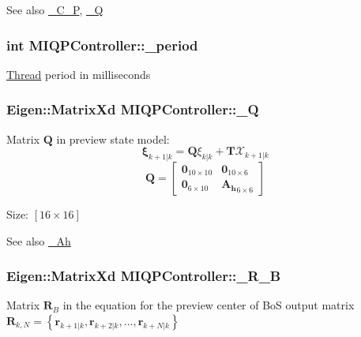 \begin{DoxySeeAlso}{\-See also}
\hyperlink{classMIQPController_a17cf6f8279cf6b2ce333feb9c8fc5a5d}{\-\_\-\-C\-\_\-\-P}, \hyperlink{classMIQPController_ac6404f74d6002d6a0ca4bd2d0b41d548}{\-\_\-\-Q} 
\end{DoxySeeAlso}
\hypertarget{classMIQPController_aed2ce53008e32e64e107398d85e75170}{
\subsubsection[{\-\_\-period}]{\setlength{\rightskip}{0pt plus 5cm}int {\bf \-M\-I\-Q\-P\-Controller\-::\-\_\-period}}}\label{classMIQPController_aed2ce53008e32e64e107398d85e75170}
\hyperlink{classThread}{\-Thread} period in milliseconds \hypertarget{classMIQPController_ac6404f74d6002d6a0ca4bd2d0b41d548}{
\subsubsection[{\-\_\-\-Q}]{\setlength{\rightskip}{0pt plus 5cm}\-Eigen\-::\-Matrix\-Xd {\bf \-M\-I\-Q\-P\-Controller\-::\-\_\-\-Q}}}\label{classMIQPController_ac6404f74d6002d6a0ca4bd2d0b41d548}
\-Matrix $\mathbf{Q}$ in preview state model\-: \[ \mathbf{\xi}_{k+1|k} = \mathbf{Q} \xi_{k|k} + \mathbf{T}\mathcal{X}_{k+1|k} \] \[ \mathbf{Q} = \left[\begin{array}{cc} \mathbf{0}_{10\times10} & \mathbf{0}_{10\times6}\\ \mathbf{0}_{6\times10} & \mathbf{A_h}_{6\times6} \end{array}\right] \]

\-Size\-: $[16\times16]$

\begin{DoxySeeAlso}{\-See also}
\hyperlink{classMIQPController_a388ed1c232c212e171276993b5cb3fec}{\-\_\-\-Ah} 
\end{DoxySeeAlso}
\hypertarget{classMIQPController_a69fbc25a2e2f2392fe0f92c5811c12dd}{
\subsubsection[{\-\_\-\-R\-\_\-\-B}]{\setlength{\rightskip}{0pt plus 5cm}\-Eigen\-::\-Matrix\-Xd {\bf \-M\-I\-Q\-P\-Controller\-::\-\_\-\-R\-\_\-\-B}}}\label{classMIQPController_a69fbc25a2e2f2392fe0f92c5811c12dd}
\-Matrix $\mathbf{R}_B$ in the equation for the preview center of \-Bo\-S output matrix $\mathbf{R}_{k,N} = \left\{ \mathbf{r}_{k+1|k}, \mathbf{r}_{k+2|k}, \dots, \mathbf{r}_{k+N|k} \right\}$

